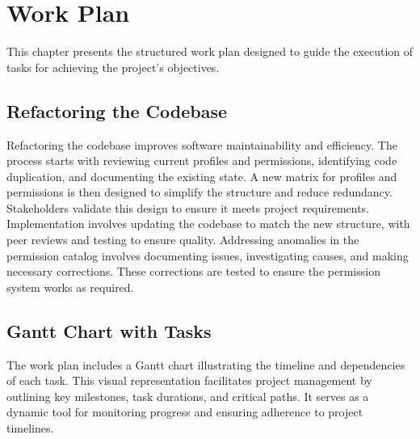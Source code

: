 %

\chapter{Work Plan}
\label{Work Plan}

This chapter presents the structured work plan designed to guide the execution of tasks for achieving the project's objectives.

\section{Refactoring the Codebase}

Refactoring the codebase improves software maintainability and efficiency. The process starts with reviewing current profiles and permissions, identifying code duplication, and documenting the existing state. A new matrix for profiles and permissions is then designed to simplify the structure and reduce redundancy. Stakeholders validate this design to ensure it meets project requirements. Implementation involves updating the codebase to match the new structure, with peer reviews and testing to ensure quality. Addressing anomalies in the permission catalog involves documenting issues, investigating causes, and making necessary corrections. These corrections are tested to ensure the permission system works as required.

\section{Gantt Chart with Tasks}

The work plan includes a Gantt chart illustrating the timeline and dependencies of each task. This visual representation facilitates project management by outlining key milestones, task durations, and critical paths. It serves as a dynamic tool for monitoring progress and ensuring adherence to project timelines.

 
